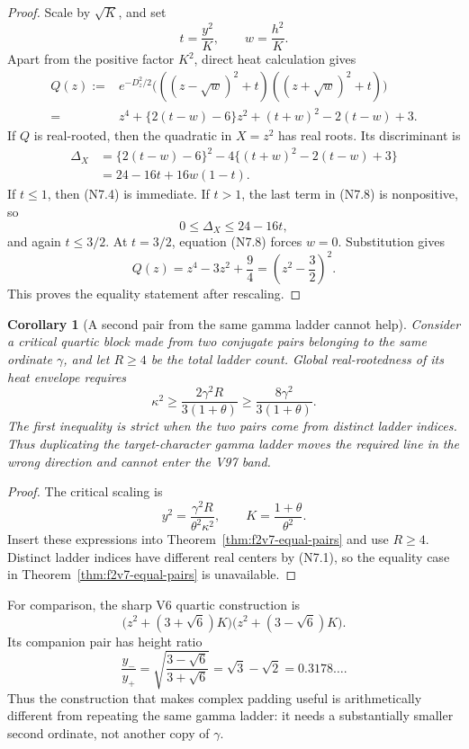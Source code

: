\documentclass[11pt]{article}
\newtheorem{corollary}[theorem]{Corollary}
\theoremstyle{definition}
\theoremstyle{remark}
\begin{document}
\begin{proof}
Scale by \(\sqrt K\), and set
\[
 t=\frac{y^2}{K},\qquad w=\frac{h^2}{K}.
 \tag{N7.6}
\]
Apart from the positive factor \(K^2\), direct heat calculation gives
\[
\begin{aligned}
 Q(z):={}&e^{-D_z^2/2}
 \bigl(((z-\sqrt w)^2+t)((z+\sqrt w)^2+t)\bigr)\\
 ={}&z^4+\{2(t-w)-6\}z^2
 +(t+w)^2-2(t-w)+3.
\end{aligned}
\tag{N7.7}
\]
If \(Q\) is real-rooted, then the quadratic in \(X=z^2\) has real roots.
Its discriminant is
\[
\begin{aligned}
 \Delta_X
 &=
 \{2(t-w)-6\}^2
 -4\{(t+w)^2-2(t-w)+3\}\\
 &=24-16t+16w(1-t).
\end{aligned}
\tag{N7.8}
\]
If \(t\le1\), then \textup{(N7.4)} is immediate.  If \(t>1\), the last
term in \textup{(N7.8)} is nonpositive, so
\[
 0\le\Delta_X\le24-16t,
 \tag{N7.9}
\]
and again \(t\le3/2\).  At \(t=3/2\), equation
\textup{(N7.8)} forces \(w=0\).  Substitution gives
\[
 Q(z)=z^4-3z^2+\frac94
 =\left(z^2-\frac32\right)^2.
 \tag{N7.10}
\]
This proves the equality statement after rescaling.
\end{proof}

\begin{corollary}[A second pair from the same gamma ladder cannot help]
\label{cor:f2v7-same-ladder}
Consider a critical quartic block made from two conjugate pairs belonging
to the same ordinate \(\gamma\), and let \(R\ge4\) be the total ladder
count.  Global real-rootedness of its heat envelope requires
\[
 \boxed{
 \kappa^2\ge
 \frac{2\gamma^2R}{3(1+\theta)}
 \ge
 \frac{8\gamma^2}{3(1+\theta)}.}
 \tag{N7.11}
\]
The first inequality is strict when the two pairs come from distinct ladder
indices.  Thus duplicating the target-character gamma ladder moves the
required line in the wrong direction and cannot enter the V97 band.
\end{corollary}

\begin{proof}
The critical scaling is
\[
 y^2=\frac{\gamma^2R}{\theta^2\kappa^2},
 \qquad
 K=\frac{1+\theta}{\theta^2}.
 \tag{N7.12}
\]
Insert these expressions into Theorem~\ref{thm:f2v7-equal-pairs} and use
\(R\ge4\).  Distinct ladder indices have different real centers by
\textup{(N7.1)}, so the equality case in
Theorem~\ref{thm:f2v7-equal-pairs} is unavailable.
\end{proof}

For comparison, the sharp V6 quartic construction is
\[
 \bigl(z^2+(3+\sqrt6)K\bigr)
 \bigl(z^2+(3-\sqrt6)K\bigr).
 \tag{N7.13}
\]
Its companion pair has height ratio
\[
 \frac{y_-}{y_+}
 =
 \sqrt{\frac{3-\sqrt6}{3+\sqrt6}}
 =\sqrt3-\sqrt2
 =0.3178\ldots.
 \tag{N7.14}
\]
Thus the construction that makes complex padding useful is arithmetically
different from repeating the same gamma ladder: it needs a substantially
smaller second ordinate, not another copy of \(\gamma\).
\end{document}
